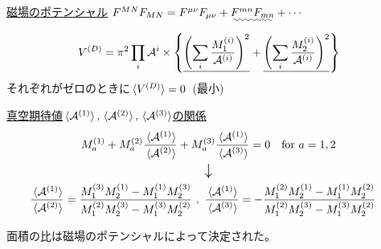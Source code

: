 \documentclass[
  unicode,a4paper,11pt,aspectratio=169,
  xcolor = {dvipsnames,svgnames},
  hyperref ={colorlinks=true,citecolor=Navy,linkcolor=NavyBlue,urlcolor=purple},
  ja=standard,lualatex
]{beamer}
\begin{document}
\begin{frame}
  
  \uline{磁場のポテンシャル}\qquad 
  $
    F^{MN}F_{MN}
    =
    F^{\mu\nu}F_{\mu\nu}
    +
    \uwave{F^{mn}F_{mn}}
    +
    \cdots
  $
  \\
  \hspace*{9cm}{\Large $\downarrow$}
  \begin{equation}
    V^{(D)}
    =
    \pi^2
    \prod_{i}\mathcal{A}^{i}
    \times
    \left\{
      \uline{
      \left(  
        \sum_{i}\frac{M_{1}^{(i)}}{\mathcal{A}^{(i)}}
      \right)^2
      }
      +
      \uline{
      \left( 
        \sum_{i}\frac{M_{2}^{(i)}}{\mathcal{A}^{(i)}}
      \right)^2
      }
    \right\}
    \nonumber
  \end{equation}
  \hspace*{6.2cm}
  それぞれがゼロのときに$\ev*{V^{(D)}}=0$\ (最小)

  \begin{center}
  \end{center}

\end{frame}

\begin{frame}
  
  \uline{真空期待値$\ev*{\mathcal{A}^{(1)}},\ev*{\mathcal{A}^{(2)}},\ev*{\mathcal{A}^{(3)}}$の関係}
  \begin{gather}
    M_{a}^{(1)}
    +
    M_{a}^{(2)}
    \frac{\ev*{\mathcal{A}^{(1)}}}{\ev*{\mathcal{A}^{(2)}}}
    +
    M_{a}^{(3)}
    \frac{\ev*{\mathcal{A}^{(1)}}}{\ev*{\mathcal{A}^{(3)}}}
    =
    0
    \quad
    \text{for}
    \ 
    a=1,2
    \nonumber    
    \\
    \text{\Large $\downarrow$}
    \nonumber
    \\
    \hspace*{-10pt}
    \frac{\ev*{\mathcal{A}^{(1)}}}{\ev*{\mathcal{A}^{(2)}}}
    =
    \frac{
      M_{1}^{(3)} M_{2}^{(1)}-M_{1}^{(1)} M_{2}^{(3)}
    }{
      M_{1}^{(2)} M_{2}^{(3)}- M_{1}^{(3)} M_{2}^{(2)}
    }
    \ ,\ 
    \frac{\ev*{\mathcal{A}^{(1)}}}{\ev*{\mathcal{A}^{(3)}}}
    =
    -\frac{
      M_{1}^{(2)} M_{2}^{(1)}-M_{1}^{(1)} M_{2}^{(2)}
    }{
      M_{1}^{(2)} M_{2}^{(3)}-M_{1}^{(3)} M_{2}^{(2)}
    }
    \nonumber
  \end{gather}
  \begin{redbox}{\empty}
    \centering
    面積の比は磁場のポテンシャルによって決定された。
  \end{redbox}
  
\end{frame}
\end{document}
